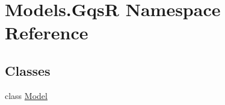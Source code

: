 \hypertarget{namespace_models_1_1_gqs_r}{\section{Models.\-Gqs\-R Namespace Reference}
\label{namespace_models_1_1_gqs_r}
}
\subsection*{Classes}
\begin{DoxyCompactItemize}
\item 
class \hyperlink{class_models_1_1_gqs_r_1_1_model}{Model}
\end{DoxyCompactItemize}
